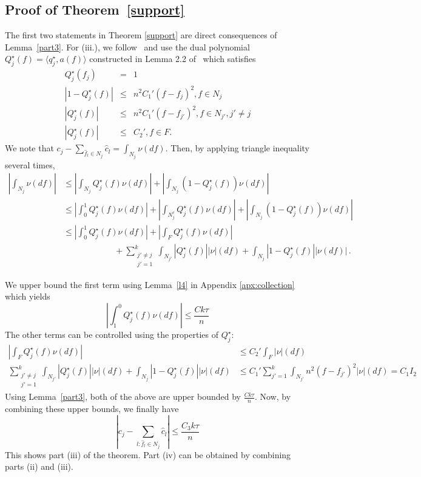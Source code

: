 \subsection{Proof of Theorem~\ref{support}}
\label{sec:support}
The first two statements in Theorem \ref{support} are direct consequences of Lemma~\ref{part3}. For (iii.), we follow~\cite{granda2} and  use the dual polynomial $Q_j^{\star} ( f) = \langle q_j^{\star}, a ( f)\rangle$ constructed in Lemma 2.2 of~\cite{granda2} which satisfies
\begin{eqnarray*}
  Q_j^{\star} ( f_j) & = & 1\\
  | 1 - Q_j^{\star} ( f) | & \leq & n^2 C_1' ( f - f_j)^2, f \in N_j\\
  | Q_j^{\star} ( f) | & \leq & n^2 C_1' ( f - f_{j'})^2, f \in N_{j'}, j' \neq
  j\\
  | Q_j^{\star} ( f) | & \leq & C_2', f \in F.
\end{eqnarray*}
We note that $c_j - \sum_{\hat{f}_l \in N_j} \hat{c}_l = \int_{N_j} \nu(df)$. Then, by applying triangle inequality several times,
\begin{align*}
\left| \int_{N_j}  \nu(df)\right|
& \leq \left| \int_{N_j}  Q_j^\star (f) \nu(df)\right| + \left| \int_{N_j}  (1-Q_j^\star (f)) \nu(df)\right|\\
& \leq \left| \int_0^1  Q_j^\star (f) \nu(df)\right| + \left| \int_{N_j^c}  Q_j^\star (f) \nu(df)\right| + \left| \int_{N_j}  (1-Q_j^\star (f)) \nu(df)\right|\\
& \leq \left|\int_0^1  Q_j^\star (f) \nu(df)\right| + \left| \int_{F}  Q_j^\star (f) \nu(df)\right| \\
&\qquad\qquad\qquad + \sum_{\substack{j' \neq j\\j'=1}}^k \int_{N_{j'}} \left| Q_j^\star (f)\right| |\nu|(df) +  \int_{N_j}  \left|1-Q_j^\star (f)\right| |\nu(df)|\,.
\end{align*}

We upper bound the first term using Lemma~\ref{l4} in Appendix \ref{apx:collection} which yields
\[
\left| \int^0_{1}  Q_j^\star (f) \nu(df)\right| \leq \frac{Ck \tau}{n}
\]
The other terms can be controlled using the properties of $Q_j^\star$:
\begin{align*}
\left| \int_{F}  Q_j^\star (f) \nu(df)\right| & \leq C_2' \int_{F} |\nu| (df)\\
\sum_{\substack{j' \neq j\\j'=1}}^k \int_{N_{j'}} \left| Q_j^\star (f)\right| |\nu|(df) +  \int_{N_j}  \left|1-Q_j^\star (f)\right| |\nu|(df)
& \leq
 C_1'\sum_{j'=1}^k \int_{N_{j'}} n^2 (f-f_{j'})^2 |\nu|(df) = C_1 I_2
\end{align*}
Using Lemma~\ref{part3}, both of the above are upper bounded by $\frac{C k \tau}{n}$. Now, by combining these upper bounds, we finally have
\[
\left| c_j - \sum_{l : \hat{f}_l \in N_j} \hat{c}_l \right| \leq \frac{C_3 k \tau}{n}
\]
This shows part (iii) of the theorem. Part (iv) can be obtained by combining parts (ii) and (iii).

